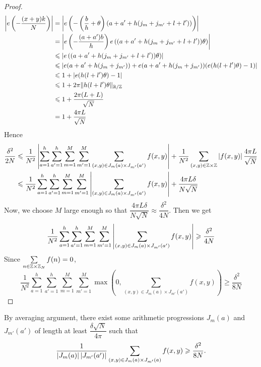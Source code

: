 \begin{proof}
	\begin{align*}
	\left\vert{e\left(-\dfrac{(x+y)k}{N}\right)}\right\vert 
	&= \left\vert{e\left(- \left( \dfrac{b}{h} + \theta \right) (a + a' + h(j_m + j_{m'} + l + l'))\right)}\right\vert 	 \\
	& = \left\vert{e\left( -\dfrac{(a+a')b}{h}\right) e\left( (a + a' + h(j_m + j_{m'} + l + l')) \theta\right)}\right\vert \\
	& \leqslant \left\vert{ e\left( (a + a' + h(j_m + j_{m'} + l + l')) \theta\right)}\right\vert\\
	& \leqslant \left\vert{e(a+ a' + h(j_m +j_{m'})) + e(a+ a' + h(j_m +j_{m'})) (e(h(l+l')\theta) - 1)}\right\vert \\
	& \leqslant 1 + \left\vert{e(h(l+l')\theta) - 1}\right\vert  \\
	& \leqslant 1 + 2\pi  \| h(l+l')\theta \|_{{\mathbb R} /{\mathbb Z}} \\
	& \leqslant 1 + \dfrac{2 \pi  (L+L)} {\sqrt{N}} \\
	& = 1 + \dfrac{4 \pi L}{\sqrt{N}} 
	\end{align*}
	Hence
	\begin{align*}
	\dfrac{\delta^2}{2N} 
	&\leqslant \dfrac{1}{N^2}\left\vert{\sum\limits_{a = 1}^h \sum\limits_{a' = 1} ^h \sum\limits_{m = 1}^M \sum\limits_{m' = 1}^M \sum\limits_{(x,y) \in J_m(a) \times J_{m'}(a')} f(x,y)}\right\vert + \dfrac{1}{N^2} \sum\limits_{(x,y) \in {\mathbb Z} \times {\mathbb Z}} \left\vert{f(x,y)}\right\vert \dfrac{4 \pi L}{\sqrt{N}} \\
	& \leqslant  \dfrac{1}{N^2} \sum\limits_{a = 1}^h \sum\limits_{a' = 1} ^h \sum\limits_{m = 1}^M \sum\limits_{m' = 1}^M \left\vert{\sum\limits_{(x,y) \in J_m(a) \times J_{m'}(a')} f(x,y)}\right\vert + \dfrac{4 \pi L \delta}{N\sqrt{N}}	
	\end{align*}
	Now, we choose $ M $ large enough so that $ \dfrac{4 \pi L \delta}{N\sqrt{N}} \approx \dfrac{\delta^2}{4N} $. Then we get
	$$ \dfrac{1}{N^2}\sum\limits_{a = 1}^h \sum\limits_{a' = 1} ^h \sum\limits_{m = 1}^M \sum\limits_{m' = 1}^M \left\vert{\sum\limits_{(x,y) \in J_m(a) \times J_{m'}(a')} f(x,y)}\right\vert \geqslant \dfrac{\delta^2}{4N} $$
	Since $ \sum\limits_{n \in {\mathbb Z} \times {\mathbb Z}_N} f(n) = 0  $, 
	$$ \dfrac{1}{N^2}\sum\limits_{a = 1}^h \sum\limits_{a' = 1} ^h \sum\limits_{m = 1}^M \sum\limits_{m' = 1}^M \max \left(0, \sum\limits_{(x,y) \in J_m(a) \times J_{m'}(a')} f(x,y) \right) \geq \dfrac{\delta^2}{8N} $$
\end{proof}
	
	\noindent By averaging argument, there exist some arithmetic progressions $ J_m(a) $ and $ J_{m'}(a') $ of length at least $ \dfrac{\delta \sqrt{N}}{4\pi} $ such that 
	$$ \dfrac{1}{\left\vert{J_m(a)}\right\vert \left\vert{J_{m'}(a')}\right\vert} \sum\limits_{(x,y) \in J_m(a) \times J_{m'}(a)} f(x,y) \geqslant \dfrac{\delta^2}{8N} .$$

